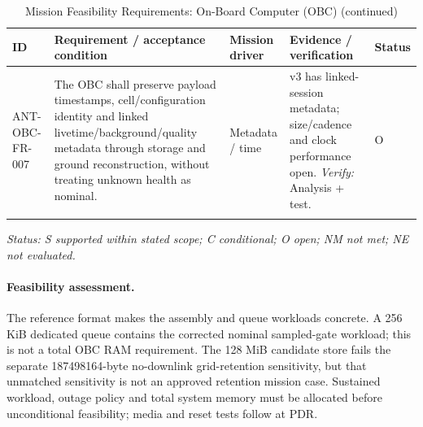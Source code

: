 \begin{table}[H]\centering\small\setlength{\tabcolsep}{3pt}
\ContinuedFloat\captionsetup{list=no}
\caption{Mission Feasibility Requirements: On-Board Computer (OBC) (continued)}
\begin{tabular}{@{}
>{\RaggedRight\arraybackslash}p{}
>{\RaggedRight\arraybackslash}p{}
>{\RaggedRight\arraybackslash}p{}
>{\RaggedRight\arraybackslash}p{}
>{\RaggedRight\arraybackslash}p{}
@{}}
\toprule ID & Requirement / acceptance condition & Mission driver & Evidence / verification & Status\\\midrule
{}\label{req:ANT-OBC-FR-007}\mbox{ANT-OBC-}\newline\mbox{FR-007} & The OBC shall preserve payload timestamps, cell/configuration identity and linked livetime/background/quality metadata through storage and ground reconstruction, without treating unknown health as nominal. & Metadata / time & v3 has linked-session metadata; size/cadence and clock performance open. \emph{Verify:} Analysis + test. & O\\
\addlinespace[3pt]
\bottomrule
\end{tabular}
\end{table}
\textit{Status: S supported within stated scope; C conditional; O open; NM not met; NE not evaluated.}
\paragraph{Feasibility assessment.} The reference format makes the assembly and queue workloads concrete. A 256 KiB dedicated queue contains the corrected nominal sampled-gate workload; this is not a total OBC RAM requirement. The 128 MiB candidate store fails the separate 187498164-byte no-downlink grid-retention sensitivity, but that unmatched sensitivity is not an approved retention mission case. Sustained workload, outage policy and total system memory must be allocated before unconditional feasibility; media and reset tests follow at PDR.
